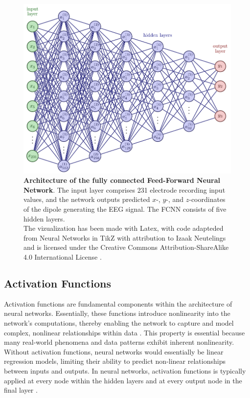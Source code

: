 \documentclass[a4paper, UKenglish, 11pt]{uiomaster}
\begin{document}
\begin{figure}[!htb]
    \centering
    \includegraphics[width=\linewidth]{figures/FFNN_architecture.pdf}
    \caption{\textbf{Architecture of the fully connected Feed-Forward Neural Network}. The input layer comprises 231 electrode recording input values, and the network outputs predicted $x$-, $y$-, and $z$-coordinates of the dipole generating the EEG signal. The FCNN consists of five hidden layers. \\
    The vizualization has been made with Latex, with code adapteded from Neural Networks in TikZ with attribution to Izaak Neutelings and is licensed under the Creative Commons Attribution-ShareAlike 4.0 International License \cite{neutelings2021}.}
    \label{fig:FFNN_architecture}
\end{figure}

\subsection{Activation Functions}
Activation functions are fundamental components within the architecture of neural networks. Essentially, these functions introduce nonlinearity into the network's computations, thereby enabling the network to capture and model complex, nonlinear relationships within data \cite{sharma2017activation}. This property is essential because many real-world phenomena and data patterns exhibit inherent nonlinearity. Without activation functions, neural networks would essentially be linear regression models, limiting their ability to predict non-linear relationships between inputs and outputs. In neural networks, activation functions is typically applied at every node within the hidden layers and at every output node in the final layer \cite{choose_activation_function}.
\end{document}
